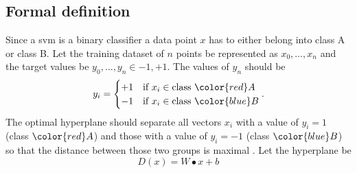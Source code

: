 \subsection*{Formal definition}
Since a \Gls{svm} is a binary classifier a data point $x$ has to either belong into class A or class B. Let the training dataset of $n$ points be represented as $x_0,\dots,x_n$ and the target values be $y_0,\dots,y_n \in {-1,+1}$. The values of $y_n$ should be 
\begin{equation}
	y_i=
		\begin{cases}
		+1 & \text{if } x_i \in \text{class } {\color{red}A} \\
		-1 & \text{if } x_i \in \text{class } {\color{blue}B}
		\end{cases}.	
\end{equation}
The optimal hyperplane should separate all vectors $x_i$ with a value of $y_i=1$ {(class ${\color{red}A}$)} and those with a value of $y_i=-1$ {(class ${\color{blue}B}$)} so that the distance between those two groups is maximal \cite{Thome2012}. Let the hyperplane be
\begin{equation}
	D(x)=W \bullet x+b
\end{equation}

